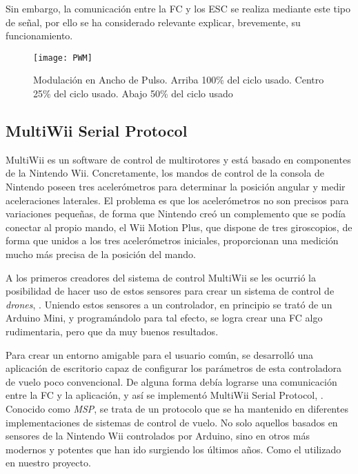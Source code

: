 Sin embargo, la comunicación entre la FC y los ESC se realiza mediante este tipo de señal, por ello se ha considerado relevante explicar, brevemente, su funcionamiento.
\begin{figure}
	\centering
	\texttt{[image: PWM]}
	\caption[PWM. Modulación en Ancho de Pulso.]{Modulación en Ancho de Pulso. Arriba 100\% del ciclo usado. Centro 25\% del ciclo usado. Abajo 50\% del ciclo usado}\label{fig:PWM}
\end{figure}


\subsection{MultiWii Serial Protocol}
\label{subsec:MSP}

MultiWii es un software de control de multirotores y está basado en componentes de la Nintendo Wii. Concretamente, los mandos de control de la consola de Nintendo poseen tres acelerómetros para determinar la posición angular y medir aceleraciones laterales. El problema es que los acelerómetros no son precisos para variaciones pequeñas, de forma que Nintendo creó un complemento que se podía conectar al propio mando, el Wii Motion Plus, que dispone de tres giroscopios, de forma que unidos a los tres acelerómetros iniciales, proporcionan una medición mucho más precisa de la posición del mando.

A los primeros creadores del sistema de control MultiWii se les ocurrió la posibilidad de hacer uso de estos sensores para crear un sistema de control de \emph{drones}, \citep{wiki:MultiWiiHistory}. Uniendo estos sensores a un controlador, en principio se trató de un Arduino Mini, y programándolo para tal efecto, se logra crear una FC algo rudimentaria, pero que da muy buenos resultados.

Para crear un entorno amigable para el usuario común, se desarrolló una aplicación de escritorio capaz de configurar los parámetros de esta controladora de vuelo poco convencional. De alguna forma debía lograrse una comunicación entre la FC y la aplicación, y así se implementó MultiWii Serial Protocol, \citep{wiki:MSPDefinition}.\\Conocido como \textit{MSP}, se trata de un protocolo que se ha mantenido en diferentes implementaciones de sistemas de control de vuelo. No solo aquellos basados en sensores de la Nintendo Wii controlados por Arduino, sino en otros más modernos y potentes que han ido surgiendo los últimos años. Como el utilizado en nuestro proyecto.


